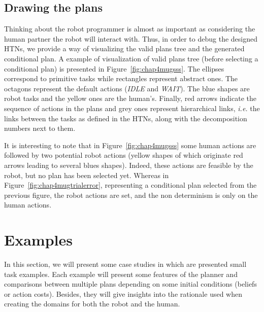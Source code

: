 \documentclass[a4paper,11pt,twoside]{StyleThese}
\begin{document}

\subsection{Drawing the plans}
Thinking about the robot programmer is almost as important as considering the human partner the robot will interact with. Thus, in order to debug the designed HTNs, we provide a way of visualizing the valid plans tree and the generated conditional plan. A example of visualization of valid plans tree (before selecting a conditional plan) is presented in Figure~\ref{fig:chap4mugsss}. The ellipses correspond to primitive tasks while rectangles represent abstract ones. The octagons represent the default actions (\textit{IDLE} and \textit{WAIT}). The blue shapes are robot tasks and the yellow ones are the human's. Finally, red arrows indicate the sequence of actions in the plans and grey ones represent hierarchical links, \textit{i.e.} the links between the tasks as defined in the HTNs, along with the decomposition numbers next to them.

It is interesting to note that in Figure~\ref{fig:chap4mugsss} some human actions are followed by two potential robot actions (yellow shapes of which originate red arrows leading to several blues shapes). Indeed, these actions are feasible by the robot, but no plan has been selected yet. Whereas in Figure~\ref{fig:chap4mugtrialerror}, representing a conditional plan selected from the previous figure, the robot actions are set, and the non determinism is only on the human actions.

\section{Examples}
In this section, we will present some case studies in which are presented small task examples. Each example will present some features of the planner and comparisons between multiple plans depending on some initial conditions (beliefs or action costs). Besides, they will give insights into the rationale used when creating the domains for both the robot and the human.
\end{document}
